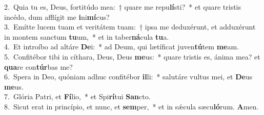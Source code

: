 {2.~}Quia tu es, Deus, fortitúdo mea:~† quare me repu\textbf{lí}sti?~* et quare tristis incédo, dum afflígit me \textbf{i}ni\textbf{mí}cus?\\
{3.~}Emítte lucem tuam et veritátem tuam:~† ipsa me deduxérunt, et adduxérunt in montem sanctum \textbf{tu}um,~* et in taber\textbf{ná}cula \textbf{tu}a.\\
{4.~}Et introíbo ad altáre \textbf{De}i:~* ad Deum, qui lætíficat juven\textbf{tú}tem \textbf{me}am.\\
{5.~}Confitébor tibi in cíthara, Deus, Deus \textbf{me}us:~* quare tristis es, ánima mea? et \textbf{qua}re con\textbf{túr}bas me?\\
{6.~}Spera in Deo, quóniam adhuc confitébor \textbf{il}li:~* salutáre vultus mei, et \textbf{De}us \textbf{me}us.\\
{7.~}Glória Patri, et \textbf{Fí}lio,~* et Spi\textbf{rí}tui \textbf{San}cto.\\
{8.~}Sicut erat in princípio, et nunc, et \textbf{sem}per,~* et in sǽcula sæcu\textbf{ló}rum. \textbf{A}men.\\
